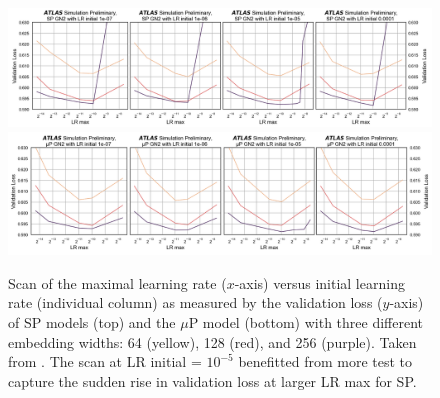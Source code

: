 \begin{figure}[h!]
  \centering
  \includegraphics[width=\textwidth]{Images/FTAG/GN/HPO/fullSP2.png}\\
  \includegraphics[width=\textwidth]{Images/FTAG/GN/HPO/fullmup2.png}
  \caption{Scan of the maximal learning rate ($x$-axis) versus initial learning rate (individual column) as measured by the validation loss ($y$-axis) of SP models (top) and the $\mu$P model (bottom) with three different embedding widths: 64 (yellow), 128 (red), and 256 (purple). Taken from \cite{publicplotMUP}. The scan at LR initial = $10^{-5}$ benefitted from more test to capture the sudden rise in validation loss at larger LR max for SP.}
  \label{fig:fullSPmup}
\end{figure} 

